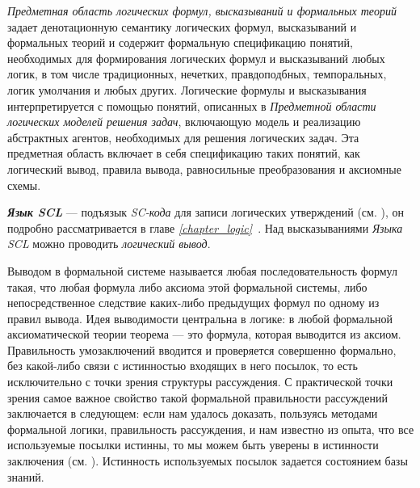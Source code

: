 \textit{Предметная область логических формул, высказываний и формальных теорий} задает денотационную семантику логических формул, высказываний и формальных теорий и содержит формальную спецификацию понятий, необходимых для формирования логических формул и высказываний любых логик, в том числе традиционных, нечетких, правдоподбных, темпоральных, логик умолчания и любых других. Логические формулы и высказывания интерпретируется с помощью понятий, описанных в \textit{Предметной области логических моделей решения задач}, включающую модель и реализацию абстрактных агентов, необходимых для решения логических задач. Эта предметная область включает в себя спецификацию таких понятий, как логический вывод, правила вывода, равносильные преобразования и аксиомные схемы.

\textit{\textbf{Язык SCL}} — подъязык \textit{SC-кода} для записи логических утверждений (см. ), он подробно рассматривается в главе \textit{\ref{chapter_logic}~}. Над высказываниями \textit{Языка SCL} можно проводить \textit{логический вывод}.

Выводом в формальной системе называется любая последовательность формул такая, что любая формула либо аксиома этой формальной системы, либо непосредственное следствие каких-либо предыдущих формул по одному из правил вывода. Идея выводимости центральна в логике: в любой формальной аксиоматической теории теорема --- это формула, которая выводится из аксиом. Правильность умозаключений вводится и проверяется совершенно формально, без какой-либо связи с истинностью входящих в него посылок, то есть исключительно с точки зрения структуры рассуждения. С практической точки зрения самое важное свойство такой формальной правильности рассуждений заключается в следующем: если нам удалось доказать, пользуясь методами формальной логики, правильность рассуждения, и нам известно из опыта, что все используемые посылки истинны, то мы можем быть уверены в истинности заключения (см. ). Истинность используемых посылок задается состоянием базы знаний.

